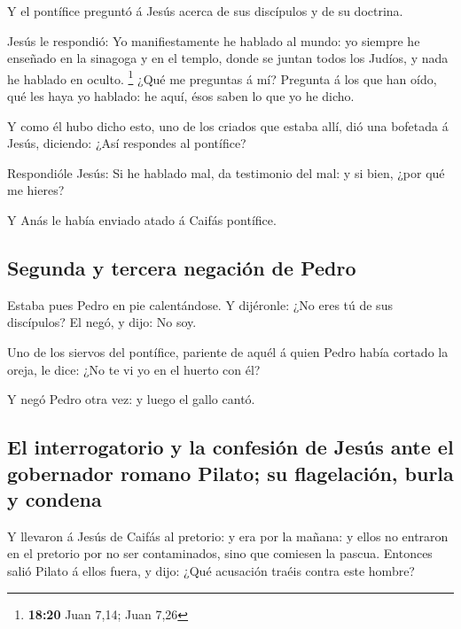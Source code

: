  Y el pontífice preguntó á Jesús acerca de sus discípulos y
de su doctrina.

 Jesús le respondió: Yo manifiestamente he hablado al
mundo: yo siempre he enseñado en la sinagoga y en el templo, donde se
juntan todos los Judíos, y nada he hablado en oculto. \footnote{\textbf{18:20}
  Juan 7,14; Juan 7,26}  ¿Qué me preguntas á mí? Pregunta á
los que han oído, qué les haya yo hablado: he aquí, ésos saben lo que yo
he dicho.

 Y como él hubo dicho esto, uno de los criados que estaba
allí, dió una bofetada á Jesús, diciendo: ¿Así respondes al pontífice?

 Respondióle Jesús: Si he hablado mal, da testimonio del
mal: y si bien, ¿por qué me hieres?

 Y Anás le había enviado atado á Caifás pontífice.

\hypertarget{segunda-y-tercera-negaciuxf3n-de-pedro}{%
\subsection{Segunda y tercera negación de
Pedro}\label{segunda-y-tercera-negaciuxf3n-de-pedro}}

 Estaba pues Pedro en pie calentándose. Y dijéronle: ¿No
eres tú de sus discípulos? El negó, y dijo: No soy.

 Uno de los siervos del pontífice, pariente de aquél á
quien Pedro había cortado la oreja, le dice: ¿No te vi yo en el huerto
con él?

 Y negó Pedro otra vez: y luego el gallo cantó.

\hypertarget{el-interrogatorio-y-la-confesiuxf3n-de-jesuxfas-ante-el-gobernador-romano-pilato-su-flagelaciuxf3n-burla-y-condena}{%
\subsection{El interrogatorio y la confesión de Jesús ante el gobernador
romano Pilato; su flagelación, burla y
condena}\label{el-interrogatorio-y-la-confesiuxf3n-de-jesuxfas-ante-el-gobernador-romano-pilato-su-flagelaciuxf3n-burla-y-condena}}

 Y llevaron á Jesús de Caifás al pretorio: y era por la
mañana: y ellos no entraron en el pretorio por no ser contaminados, sino
que comiesen la pascua.  Entonces salió Pilato á ellos
fuera, y dijo: ¿Qué acusación traéis contra este hombre?

